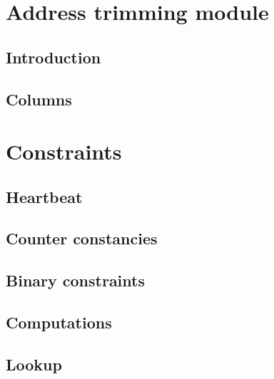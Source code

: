 
\section{Address trimming module}
\subsection{Introduction}               
\subsection{Columns}                    

\section{Constraints}
\subsection{Heartbeat}                  \label{sec: heartbeat} 
\subsection{Counter constancies}        
\subsection{Binary constraints}         
\subsection{Computations}               
\subsection{Lookup}                     
